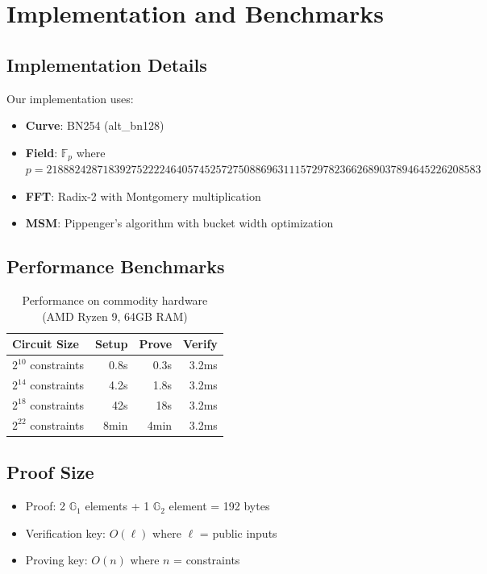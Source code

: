 \documentclass[11pt,a4paper]{article}
\newcommand{\F}{\mathbb{F}}
\newcommand{\G}{\mathbb{G}}
\begin{document}
\section{Implementation and Benchmarks}
\label{sec:implementation}

\subsection{Implementation Details}

Our implementation uses:
\begin{itemize}
    \item \textbf{Curve}: BN254 (alt\_bn128)
    \item \textbf{Field}: $\F_p$ where $p = 21888242871839275222246405745257275088696311157297823662689037894645226208583$
    \item \textbf{FFT}: Radix-2 with Montgomery multiplication
    \item \textbf{MSM}: Pippenger's algorithm with bucket width optimization
\end{itemize}

\subsection{Performance Benchmarks}

\begin{table}[h]
\centering
\begin{tabular}{lrrr}
\toprule
\textbf{Circuit Size} & \textbf{Setup} & \textbf{Prove} & \textbf{Verify} \\
\midrule
$2^{10}$ constraints & 0.8s & 0.3s & 3.2ms \\
$2^{14}$ constraints & 4.2s & 1.8s & 3.2ms \\
$2^{18}$ constraints & 42s & 18s & 3.2ms \\
$2^{22}$ constraints & 8min & 4min & 3.2ms \\
\bottomrule
\end{tabular}
\caption{Performance on commodity hardware (AMD Ryzen 9, 64GB RAM)}
\label{tab:benchmarks}
\end{table}

\subsection{Proof Size}

\begin{itemize}
    \item Proof: 2 $\G_1$ elements + 1 $\G_2$ element = 192 bytes
    \item Verification key: $O(\ell)$ where $\ell$ = public inputs
    \item Proving key: $O(n)$ where $n$ = constraints
\end{itemize}
\end{document}
